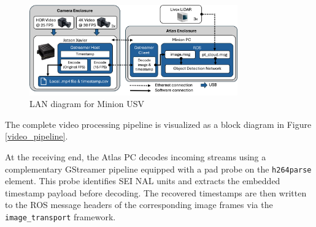 \documentclass{erauthesis}
\begin{document}
\begin{figure}[htbp]
\centering
\includegraphics[width=0.8\textwidth]{Images/Block_Diagram.png}
\caption{LAN diagram for Minion USV}
\label{fig:sensor_block_diagram}
\end{figure}


The complete video processing pipeline is visualized as a block diagram in Figure \ref{video_pipeline}.


At the receiving end, the Atlas PC decodes incoming streams using a complementary GStreamer pipeline equipped with a pad probe on the \texttt{h264parse} element. This probe identifies SEI NAL units and extracts the embedded timestamp payload before decoding. The recovered timestamps are then written to the ROS message headers of the corresponding image frames via the \texttt{image\_transport} framework.
\end{document}

